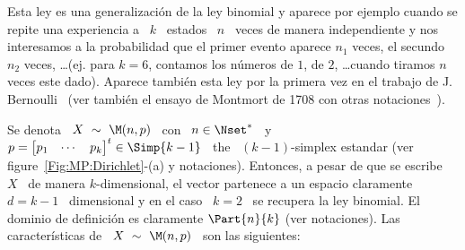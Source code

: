 \label{Sssec:MP:Multinomial}

Esta ley es una generalizaci\'on de la ley binomial y aparece por ejemplo cuando
se  repite  una  experiencia  a  \  $k$  \ estados  \  $n$  \  veces  de  manera
independiente y nos  interesamos a la probabilidad que  el primer evento aparece
$n_1$ veces,  el secundo  $n_2$ veces, \ldots  (ej. para  $k = 6$,  contamos los
n\'umeros de  $1$, de $2$, \ldots  cuando tiramos $n$ veces  este dado). Aparece
tambi\'en    esta   ley    por   la    primera    vez   en    el   trabajo    de
J.  Bernoulli~\cite{Ber1713,  Hal90,  DavEdw01}  (ver  tambi\'en  el  ensayo  de
Montmort de 1708 con otras notaciones~\cite{Mon13}).

Se  denota  \  $X  \ \sim  \  \M(n,p)$  \  con  \  $n  \in  \Nset^*$ \  y  \  $p
= \begin{bmatrix}  p_1 & \cdots  & p_k \end{bmatrix}^t  \in \Simp{k-1}$ \  the \
$(k-1)$-simplex  estandar (ver figure~\ref{Fig:MP:Dirichlet}-(a)  y notaciones).
Entonces, a pesar de que se escribe \ $X$ \ de manera $k$-dimensional, el vector
partenece a un espacio claramente \ $d =  k-1$ \ dimensional y en el caso \ $k =
2$  \ se  recupera la  ley binomial.  El dominio de definici\'on es claramente $\Part{n}{k}$ (ver notaciones). Las caracter\'isticas  de \  $X \  \sim \
\M(n,p)$ \ son las siguientes:

